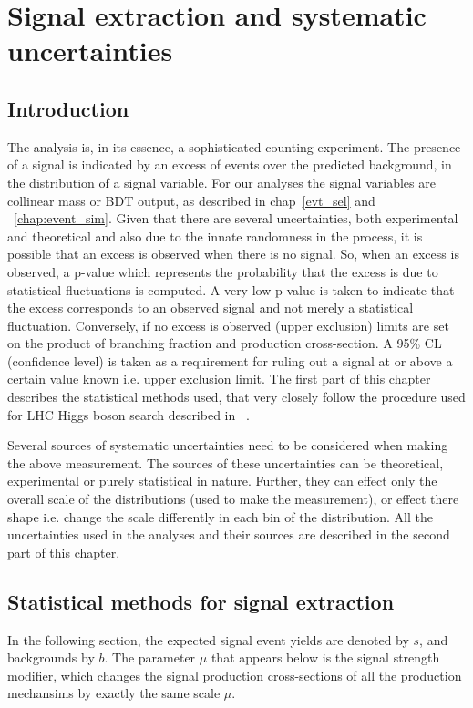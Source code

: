 %
%

\chapter{Signal extraction and systematic uncertainties}
\label{sig_ext}
\section{Introduction}
The analysis is, in its essence, a sophisticated counting experiment. The presence of a signal is indicated by an excess of events over the predicted background, in the distribution of a signal variable. For our analyses the signal variables are collinear mass or BDT output, as described in chap~\ref{evt_sel} and ~\ref{chap:event_sim}. Given that there are several uncertainties, both experimental and theoretical and also due to the innate randomness in the process, it is possible that an excess is observed when there is no signal. So, when an excess is observed, a p-value which represents the probability that the excess is due to statistical fluctuations is computed. A very low p-value is taken to indicate that the excess corresponds to an observed signal and not merely a statistical fluctuation. Conversely, if no excess is observed (upper exclusion) limits are set on the product of branching fraction and production cross-section. A 95\% CL (confidence level) is taken as a requirement for ruling out a signal at or above a certain value known i.e. upper exclusion limit. The first part of this chapter describes the statistical methods used, that very closely follow the procedure used for LHC Higgs boson search described in ~\cite{note2011}.

Several sources of systematic uncertainties need to be considered when making the above measurement. The sources of these uncertainties can be theoretical, experimental or purely statistical in nature. Further, they can effect only the overall scale of the distributions (used to make the measurement), or effect there shape i.e. change the scale differently in each bin of the distribution. All the uncertainties used in the analyses and their sources are described in the second part of this chapter.      



\section{Statistical methods for signal extraction}
\label{stat_meth}
In the following section, the expected signal event yields are denoted by $s$, and backgrounds by $b$. The parameter $\mu$ that appears below is the signal strength modifier, which changes the signal production cross-sections of all the production mechansims by exactly the same scale $\mu$.

